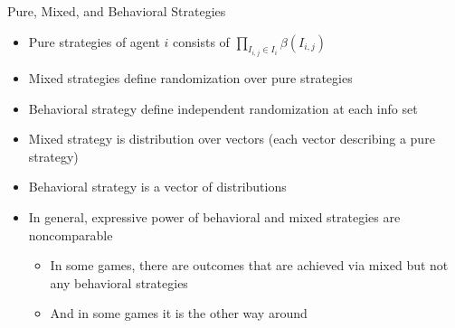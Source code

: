 \documentclass[11pt,aspectratio=169]{beamer}
\begin{document}
  \begin{frame}{Pure, Mixed, and Behavioral Strategies}
   \begin{itemize}[<+->]
   \setlength{\itemsep}{1em}
    \item \alert{Pure strategies} of agent $i$ consists of $\prod_{I_{i,j} \in I_i} \beta(I_{i,j})$
    \item \alert{Mixed strategies} define randomization over pure strategies
    \item \alert{Behavioral strategy} define independent randomization at each info set
    \item Mixed strategy is \alert{distribution over vectors} (each vector describing a pure strategy)
    \item Behavioral strategy is a \alert{vector of distributions}
    \item In general, expressive power of behavioral and mixed strategies are noncomparable
    \begin{itemize}
     \item In some games, there are outcomes that are achieved via mixed but not any behavioral strategies
     \item And in some games it is the other way around
    \end{itemize}
   \end{itemize}
  \end{frame}
  
\end{document}
